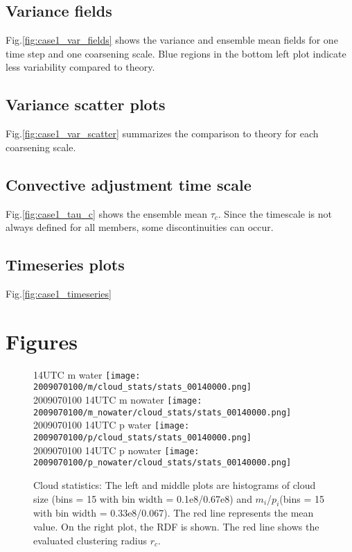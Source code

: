 \documentclass[a4paper, 12pt]{article}
\begin{document}
\subsection{Variance fields}
Fig.\ref{fig:case1_var_fields} shows the variance and ensemble mean fields for one time step and one coarsening scale. Blue regions in the bottom left plot indicate less variability compared to theory.

\subsection{Variance scatter plots}
Fig.\ref{fig:case1_var_scatter} summarizes the comparison to theory for each coarsening scale.

\subsection{Convective adjustment time scale}
Fig.\ref{fig:case1_tau_c} shows the ensemble mean $\tau_c$. Since the timescale is not always defined for all members, some discontinuities can occur. 

\subsection{Timeseries plots}
Fig.\ref{fig:case1_timeseries}




\newpage

{\small
 }

\newpage
\section{Figures}


\begin{figure}[ht] \label{fig:case1_stats}
\noindent {} 14UTC m water
\texttt{[image: 2009070100/m/cloud\_stats/stats\_00140000.png]}\\
2009070100 14UTC m nowater
\texttt{[image: 2009070100/m\_nowater/cloud\_stats/stats\_00140000.png]}\\
2009070100 14UTC p water
\texttt{[image: 2009070100/p/cloud\_stats/stats\_00140000.png]}\\
2009070100 14UTC p nowater
\texttt{[image: 2009070100/p\_nowater/cloud\_stats/stats\_00140000.png]}\\
\caption{Cloud statistics: The left and middle plots are histograms of cloud size (bins = 15 with bin width = 0.1e8/0.67e8) and $m_i$/$p_i$(bins = 15 with bin width = 0.33e8/0.067). The red line represents the mean value. On the right plot, the RDF is shown. The red line shows the evaluated clustering radius $r_c$.}
\end{figure}
\end{document}
